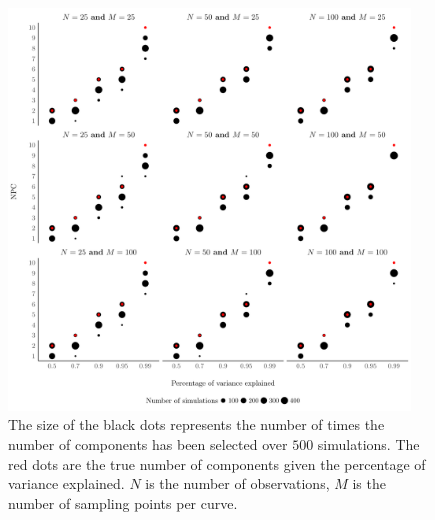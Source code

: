 \begin{figure}
     \centering
    \includegraphics[width=0.95\textwidth]{figures/npc_estim.pdf}
    \caption{The size of the black dots represents the number of times the number of components has been selected over $500$ simulations. The red dots are the true number of components given the percentage of variance explained. $N$ is the number of observations, $M$ is the number of sampling points per curve.}
    \label{fig:npc_estim}
\end{figure}


